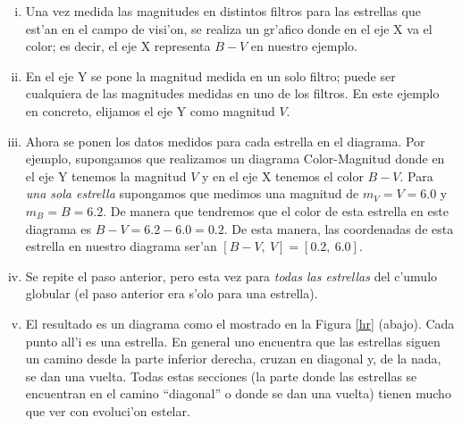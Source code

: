 \documentclass{article}
\begin{document}
\begin{enumerate}[a)]
\begin{enumerate} [i)]
\item Una vez medida las magnitudes en distintos filtros para las estrellas que est'an en el campo de visi'on, se realiza un gr'afico donde en el eje X va el color; es decir, el eje X representa $B-V$ en nuestro ejemplo.

\item En el eje Y se pone la magnitud medida en un solo filtro; puede ser cualquiera de las magnitudes medidas en uno de los filtros. En este ejemplo en concreto, elijamos el eje Y como magnitud $V$.

\item Ahora se ponen los datos medidos para cada estrella en el diagrama. Por ejemplo, supongamos que realizamos un diagrama Color-Magnitud donde en el eje Y tenemos la magnitud $V$ y en el eje X tenemos el color $B-V$. Para \textit{una sola estrella} supongamos que medimos una magnitud de $m_V = V = 6.0$ y $m_B = B = 6.2$. De manera que tendremos que el color de esta estrella en este diagrama es $B-V = 6.2 - 6.0 = 0.2$. De esta manera, las coordenadas de esta estrella en nuestro diagrama ser'an $[B-V, \ V] = [0.2, \ 6.0]$.

\item Se repite el paso anterior, pero esta vez para \emph{todas las estrellas} del c'umulo globular (el paso anterior era s'olo para una estrella).

\item El resultado es un diagrama como el mostrado en la Figura \ref{hr} (abajo). Cada punto all'i es una estrella. En general uno encuentra que las estrellas siguen un camino desde la parte inferior derecha, cruzan en diagonal y, de la nada, se dan una vuelta. Todas estas secciones (la parte donde las estrellas se encuentran en el camino ``diagonal'' o donde se dan una vuelta) tienen mucho que ver con evoluci'on estelar.
\end{enumerate}


\end{enumerate}
\end{document}
